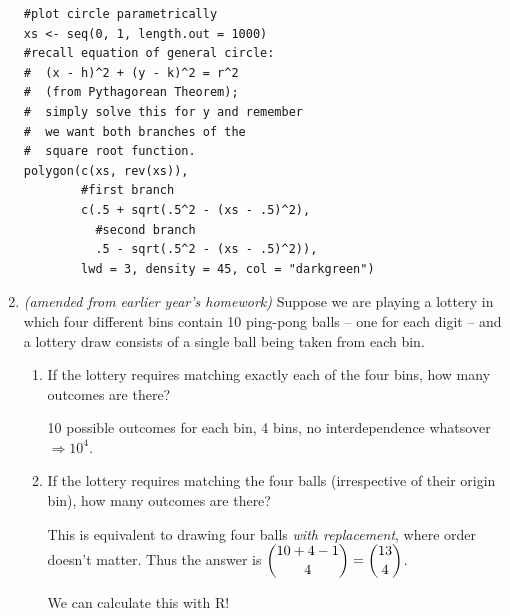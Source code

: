 \documentclass{article}
\newenvironment{solution}{\color{red}}{\color{black}}
\begin{document}
\begin{enumerate}
\begin{solution}
\begin{lstlisting}
#plot circle parametrically
xs <- seq(0, 1, length.out = 1000)
#recall equation of general circle:
#  (x - h)^2 + (y - k)^2 = r^2
#  (from Pythagorean Theorem);
#  simply solve this for y and remember
#  we want both branches of the 
#  square root function.
polygon(c(xs, rev(xs)),
        #first branch
        c(.5 + sqrt(.5^2 - (xs - .5)^2),
          #second branch
          .5 - sqrt(.5^2 - (xs - .5)^2)),
        lwd = 3, density = 45, col = "darkgreen")
\end{lstlisting}

\end{solution}

\item \textit{(amended from earlier year's homework)} Suppose we are playing a lottery in which four different bins contain 10 ping-pong balls -- one for each digit -- and a lottery draw consists of a single ball being taken from each bin.
\begin{enumerate}
\item If the lottery requires matching exactly each of the four bins, how many outcomes are there?

\begin{solution}
10 possible outcomes for each bin, 4 bins, no interdependence whatsover $\Rightarrow 10^4$.
\end{solution}

\item If the lottery requires matching the four balls (irrespective of their origin bin), how many outcomes are there?

\begin{solution}
This is equivalent to drawing four balls \textit{with replacement}, where order doesn't matter. Thus the answer is $\dbinom{10 + 4 - 1}{4} = \dbinom{13}4$.

We can calculate this with R!


\end{solution}
\end{enumerate}
\end{enumerate}
\end{document}
